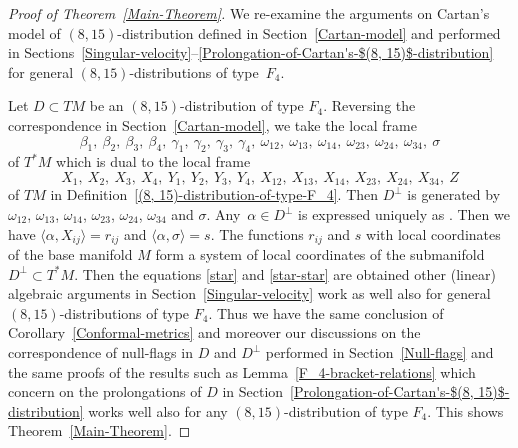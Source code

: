 \begin{proof}[Proof of Theorem~\ref{Main-Theorem}]
We re-examine the arguments on Cartan's model of $(8, 15)$-dis\-tri\-bu\-tion
defined in Section~\ref{Cartan-model} and performed in Sections~\ref{Singular-velocity}--\ref{Prolongation-of-Cartan's-$(8, 15)$-distribution} for general $(8, 15)$-dis\-tri\-bu\-tions of type~$F_4$.

Let $D \subset TM$ be an $(8, 15)$-distribution of type $F_4$.
Reversing the correspondence in Section~\ref{Cartan-model},
we take the local frame
\[
\beta_1,\ \beta_2,\ \beta_3,\ \beta_4,\ \gamma_1,\ \gamma_2,\ \gamma_3,\ \gamma_4,\ \omega_{12},\ \omega_{13},\
\omega_{14},\ \omega_{23},\ \omega_{24},\ \omega_{34},\ \sigma
\]
of $T^*M$ which is dual to the local frame
\[
X_1,\ X_2,\ X_3,\ X_4,\ Y_1,\ Y_2,\ Y_3,\ Y_4,\ X_{12},\ X_{13},\ X_{14},\ X_{23},\ X_{24},\ X_{34},\ Z
\]
of $TM$ in Definition~\ref{(8, 15)-distribution-of-type-F_4}. Then $D^\perp$ is
generated by $\omega_{12}$,
$\omega_{13}$, $\omega_{14}$, $\omega_{23}$, $\omega_{24}$, $\omega_{34}$ and $\sigma$.
Any~$\alpha \in D^\perp$ is expressed uniquely as
. Then
we have $\langle \alpha, X_{ij}\rangle = r_{ij}$ and $\langle \alpha, \sigma\rangle = s$.
The functions $r_{ij}$ and $s$ with local coordinates of the base manifold
$M$ form a system of local coordinates of the submanifold $D^\perp \subset T^*M$.
Then the equations \eqref{star} and \eqref{star-star} are obtained
other (linear) algebraic arguments in Section~\ref{Singular-velocity} work as well
also for general $(8, 15)$-distributions of type $F_4$. Thus we have
the same conclusion of Corollary~\ref{Conformal-metrics} and moreover our discussions
on the correspondence of null-flags in $D$ and $D^\perp$
performed in Section~\ref{Null-flags} and the same proofs
of the results such as Lemma~\ref{F_4-bracket-relations}
which concern on the prolongations of $D$ in Section~\ref{Prolongation-of-Cartan's-$(8, 15)$-distribution}
works well also for any $(8, 15)$-distribution of type $F_4$. This shows Theorem~\ref{Main-Theorem}.
\end{proof}
